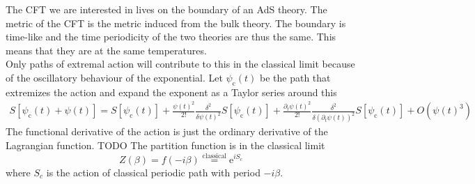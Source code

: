 \documentclass[12pt]{report}
\newcommand{\e}{\ensuremath{\mathrm{e}}}
\renewcommand{\i}{\ensuremath{i}}
\begin{document}
The CFT we are interested in lives on the boundary of an AdS theory. The metric of the CFT is the metric induced from the bulk theory. The boundary is time-like and the time periodicity of the two theories are thus the same. This means that they are at the same temperatures.\\
Only paths of extremal action will contribute to this in the classical limit because of the oscillatory behaviour of the exponential. Let $\psi_\mathrm{c}(t)$ be the path that extremizes the action and expand the exponent as a Taylor series around this
\begin{equation}
\begin{split}
 S[\psi_\mathrm{c}(t)+\psi(t)]=S[\psi_\mathrm{c}(t)]+\frac{\psi(t)^2}{2!}\frac{\delta^2}{\delta\psi(t)^2} S[\psi_\mathrm{c}(t)]+
\frac{\partial_t\psi(t)^2}{2!}\frac{\delta^2}{\delta(\partial_t\psi(t))^2} S[\psi_\mathrm{c}(t)]+O(\psi(t)^3)
\end{split}
\end{equation}
The functional derivative of the action is just the ordinary derivative of the Lagrangian function. TODO
The partition function is in the classical limit
\begin{equation}
 Z(\beta)=f(-\i\beta)\stackrel{\mathrm{classical}}{=} \e^{i S_c}\label{classical}
\end{equation}
where $S_c$ is the action of classical periodic path with period $-\i\beta$.
\end{document}
